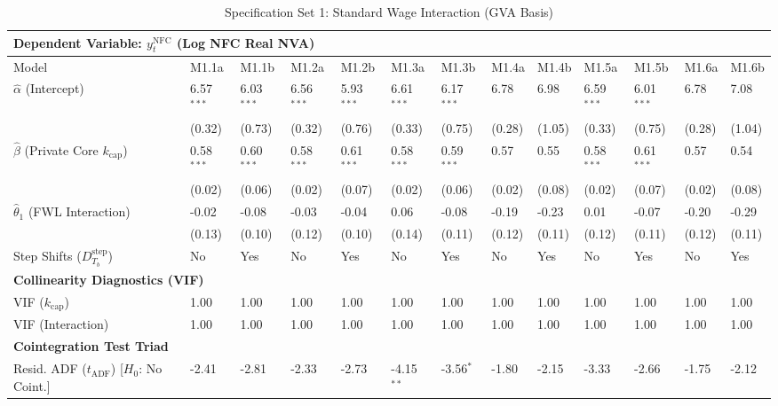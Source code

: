 \begin{table}[H]
\centering
\setlength{\tabcolsep}{2.5pt}
\caption{Specification Set 1: Standard Wage Interaction (GVA Basis)}
\label{tab:specA_set1_gva}
\scriptsize
\begin{tabular}{p{3.8cm}p{1.1cm}p{1.1cm}p{1.1cm}p{1.1cm}p{1.1cm}p{1.1cm}p{1.1cm}p{1.1cm}p{1.1cm}p{1.1cm}p{1.1cm}p{1.1cm}}
\toprule
\multicolumn{13}{l}{\textbf{Dependent Variable: $y_t^{\text{NFC}}$ (Log NFC Real NVA)}} \\
\midrule
Model & M1.1a & M1.1b & M1.2a & M1.2b & M1.3a & M1.3b & M1.4a & M1.4b & M1.5a & M1.5b & M1.6a & M1.6b \\
\midrule
$\hat{\alpha}$ (Intercept) & 6.57$^{***}$ & 6.03$^{***}$ & 6.56$^{***}$ & 5.93$^{***}$ & 6.61$^{***}$ & 6.17$^{***}$ & 6.78 & 6.98 & 6.59$^{***}$ & 6.01$^{***}$ & 6.78 & 7.08 \\
 & (0.32) & (0.73) & (0.32) & (0.76) & (0.33) & (0.75) & (0.28) & (1.05) & (0.33) & (0.75) & (0.28) & (1.04) \\
$\hat{\beta}$ (Private Core $k_{\text{cap}}$) & 0.58$^{***}$ & 0.60$^{***}$ & 0.58$^{***}$ & 0.61$^{***}$ & 0.58$^{***}$ & 0.59$^{***}$ & 0.57 & 0.55 & 0.58$^{***}$ & 0.61$^{***}$ & 0.57 & 0.54 \\
 & (0.02) & (0.06) & (0.02) & (0.07) & (0.02) & (0.06) & (0.02) & (0.08) & (0.02) & (0.07) & (0.02) & (0.08) \\
$\hat{\theta}_1$ (FWL Interaction) & -0.02 & -0.08 & -0.03 & -0.04 & 0.06 & -0.08 & -0.19 & -0.23 & 0.01 & -0.07 & -0.20 & -0.29 \\
 & (0.13) & (0.10) & (0.12) & (0.10) & (0.14) & (0.11) & (0.12) & (0.11) & (0.12) & (0.11) & (0.12) & (0.11) \\
Step Shifts ($D_{T_b}^{\text{step}}$) & No & Yes & No & Yes & No & Yes & No & Yes & No & Yes & No & Yes \\
\midrule
\multicolumn{13}{l}{\textbf{Collinearity Diagnostics (VIF)}} \\
VIF ($k_{\text{cap}}$) & 1.00 & 1.00 & 1.00 & 1.00 & 1.00 & 1.00 & 1.00 & 1.00 & 1.00 & 1.00 & 1.00 & 1.00 \\
VIF (Interaction) & 1.00 & 1.00 & 1.00 & 1.00 & 1.00 & 1.00 & 1.00 & 1.00 & 1.00 & 1.00 & 1.00 & 1.00 \\
\midrule
\multicolumn{13}{l}{\textbf{Cointegration Test Triad}} \\
Resid. ADF ($t_{\text{ADF}}$) [$H_0$: No Coint.] & -2.41 & -2.81 & -2.33 & -2.73 & -4.15$^{**}$ & -3.56$^{*}$ & -1.80 & -2.15 & -3.33 & -2.66 & -1.75 & -2.12 \\

\end{tabular}
\end{table}
